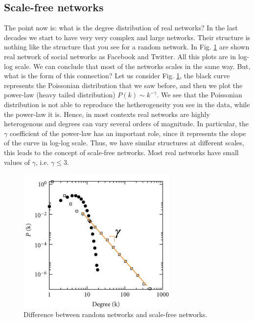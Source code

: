 \documentclass[../main/main.tex]{subfiles}
\begin{document}
\subsection{Scale-free networks}

The point now is: what is the degree distribution of real networks? In the last decades we start to have very very complex and large networks. Their structure is nothing like the structure that you see for a random network. In Fig. \ref{fig:07_4} are shown real network of social networks as Facebook and Twitter. All this plots are in log-log scale. We can conclude that most of the networks scales in the same way.
But, what is the form of this connection? Let us consider Fig. \ref{fig:07_4}, the black curve represents the Poissonian distribution that we saw before, and then we plot the power-law (heavy tailed distribution) \( P(k) \sim k^{- \gamma  } \). We see that the Poissonian distribution is not able to reproduce the hetherogeneity you see in the data, while the power-law it is. Hence, in most contexts real networks are highly heterogenous and degrees can vary several orders of magnitude. In particular, the \( \gamma   \) coefficient of the power-law has an important role, since it represents the slope of the curve in log-log scale.
Thus, we have similar structures at different scales, this leads to the concept of scale-free networks. Most real networks have small values of \( \gamma   \), i.e. \( \gamma \le 3 \).


\begin{figure}[h!]
\centering
\includegraphics[width=0.7\textwidth]{../lessons/image/07/5.png}
\caption{\label{fig:07_4} Difference between random networks and scale-free networks.}
\end{figure}
\end{document}
